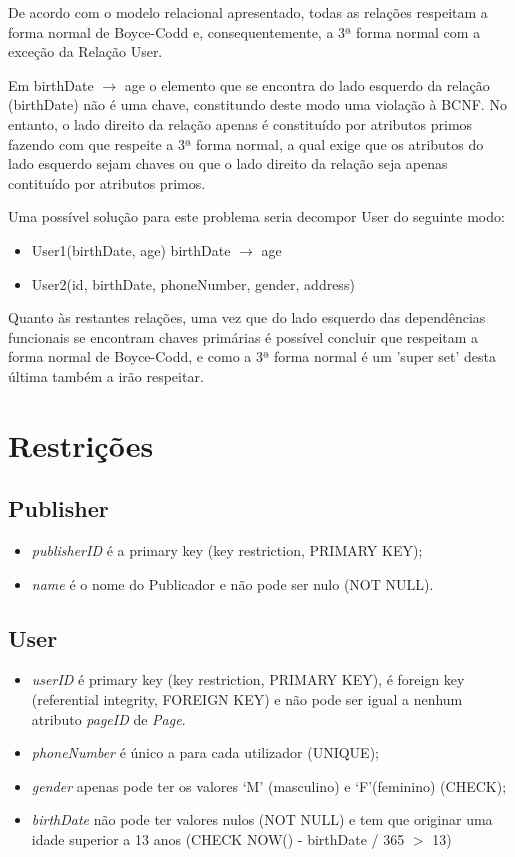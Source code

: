 \documentclass[12pt]{report}
\begin{document}
De acordo com o modelo relacional apresentado, todas as relações respeitam a forma normal de Boyce-Codd e,  consequentemente, a 3ª forma normal com a exceção da Relação User. \par
Em birthDate $\rightarrow$ age o elemento que se encontra do lado esquerdo da relação (birthDate) não é uma chave, constitundo deste modo uma violação à BCNF. No entanto, o lado direito da relação apenas é constituído por atributos primos fazendo com que respeite a 3ª forma normal, a qual exige que os atributos do lado esquerdo sejam chaves ou que o lado direito da relação seja apenas contituído por atributos primos. \par
Uma possível solução para este problema seria decompor User do seguinte modo:

\begin{itemize}
    \item User1(birthDate, age)
    birthDate $\rightarrow$ age
    \item User2(id, birthDate, phoneNumber, gender, address)
\end{itemize}

Quanto às restantes relações, uma vez que do lado esquerdo das dependências funcionais se encontram chaves primárias é possível concluir que respeitam a forma normal de Boyce-Codd, e como a 3ª forma normal é um 'super set' desta última também a irão respeitar.

\chapter{Restrições}

\section{Publisher}

\begin{itemize}
    \item \textit{publisherID} é a primary key (key restriction, PRIMARY KEY);
    \item \textit{name} é o nome do Publicador e não pode ser nulo (NOT NULL).
\end{itemize}

\section{User}

\begin{itemize}
    \item \textit{userID} é primary key (key restriction, PRIMARY KEY), é foreign key (referential integrity, FOREIGN KEY) e não pode ser igual a nenhum atributo \textit{pageID} de \textit{Page}.
    \item \textit{phoneNumber} é único a para cada utilizador (UNIQUE);
    \item \textit{gender} apenas pode ter os valores ‘M’ (masculino) e ‘F’(feminino) (CHECK);
    \item \textit{birthDate} não pode ter valores nulos (NOT NULL) e tem que originar uma idade superior a 13 anos (CHECK NOW() - birthDate / 365 $>$ 13)
\end{itemize}
\end{document}
